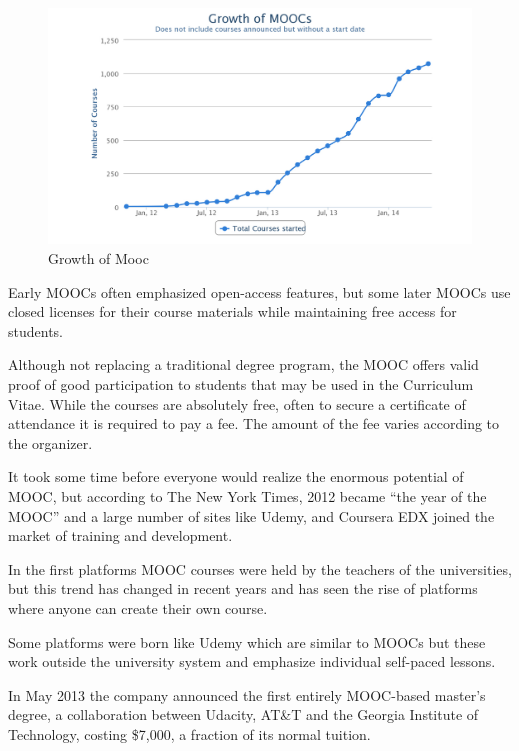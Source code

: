 \begin{figure}[htb] %
 \centering
 \includegraphics[width=0.8\linewidth]{images/chapter1/mooc.jpg}\hfill
 \caption[Growth of Mooc]{Growth of Mooc}
 \label{fig:fourV}
\end{figure}


Early MOOCs often emphasized open-access features, but some later MOOCs use closed licenses for their course materials while maintaining free access for students.\cite{mooc_wiki}

Although not replacing a traditional degree program, the MOOC offers valid proof of good participation to students that may be used in the Curriculum Vitae. While the courses are absolutely free, often to secure a certificate of attendance it is required to pay a fee. The amount of the fee varies according to the organizer.


It took some time before everyone would realize the enormous potential of MOOC, but according to The New York Times, 2012 became “the year of the MOOC” and a large number of sites like Udemy, and Coursera EDX joined the market of training and development.

In the first platforms MOOC courses were held by the teachers of the universities, but this trend has changed in recent years and has seen the rise of platforms where anyone can create their own course.

Some platforms were born like Udemy which are similar to MOOCs but these work outside the university system and emphasize individual self-paced lessons.

In May 2013 the company announced the first entirely MOOC-based master's degree, a collaboration between Udacity, AT\&T and the Georgia Institute of Technology, costing \$7,000, a fraction of its normal tuition.\cite{mooc_wiki}

